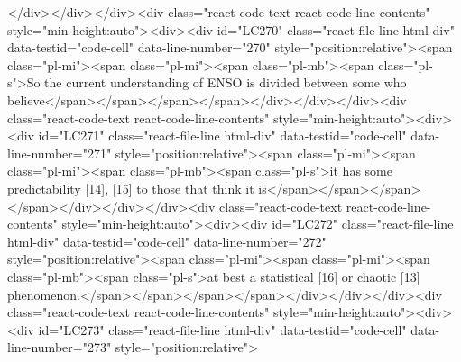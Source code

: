 {{{</div></div></div><div class="react-code-text react-code-line-contents" style="min-height:auto"><div><div id="LC270" class="react-file-line html-div" data-testid="code-cell" data-line-number="270" style="position:relative"><span class="pl-mi"><span class="pl-mi"><span class="pl-mb"><span class="pl-s">So the current understanding of ENSO is divided between some who believe</span></span></span></span></div></div></div><div class="react-code-text react-code-line-contents" style="min-height:auto"><div><div id="LC271" class="react-file-line html-div" data-testid="code-cell" data-line-number="271" style="position:relative"><span class="pl-mi"><span class="pl-mi"><span class="pl-mb"><span class="pl-s">it has some predictability {[}14{]}, {[}15{]} to those that think it is</span></span></span></span></div></div></div><div class="react-code-text react-code-line-contents" style="min-height:auto"><div><div id="LC272" class="react-file-line html-div" data-testid="code-cell" data-line-number="272" style="position:relative"><span class="pl-mi"><span class="pl-mi"><span class="pl-mb"><span class="pl-s">at best a statistical {[}16{]} or chaotic {[}13{]} phenomenon.</span></span></span></span></div></div></div><div class="react-code-text react-code-line-contents" style="min-height:auto"><div><div id="LC273" class="react-file-line html-div" data-testid="code-cell" data-line-number="273" style="position:relative">
}}}
